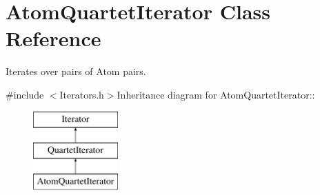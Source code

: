 \hypertarget{classJKBuilder_1_1AtomQuartetIterator}{
\section{AtomQuartetIterator Class Reference}
\label{classJKBuilder_1_1AtomQuartetIterator}
}


Iterates over pairs of Atom pairs.  


{\ttfamily \#include $<$Iterators.h$>$}Inheritance diagram for AtomQuartetIterator::\begin{figure}[H]
\begin{center}
\leavevmode
\includegraphics[height=3cm]{classJKBuilder_1_1AtomQuartetIterator}
\end{center}
\end{figure}
